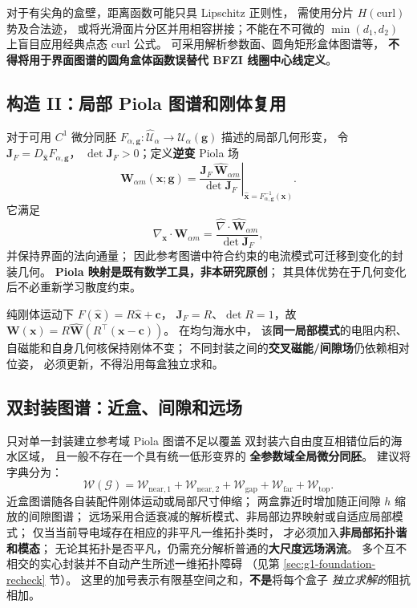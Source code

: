 对于有尖角的盒壁，距离函数可能只具 Lipschitz 正则性，
需使用分片 \(H(\mathrm{curl})\) 势及合法迹，
或将光滑面片分区并用相容拼接；不能在不可微的
\(\min(d_1,d_2)\) 上盲目应用经典点态 curl 公式。
可采用解析参数面、圆角矩形盒体图谱等，
\textbf{不得将用于界面图谱的圆角盒体函数误替代 BFZI 线圈中心线定义}。

\subsection{构造 II：局部 Piola 图谱和刚体复用}
对于可用 \(C^1\) 微分同胚
\(F_{\alpha,\bm g}:\widehat{\mathcal U}_\alpha
\to\mathcal U_\alpha(\bm g)\) 描述的局部几何形变，
令 \(\bm J_F=D_{\widehat{\bm x}}F_{\alpha,\bm g}\)，
\(\det\bm J_F>0\)；定义\textbf{逆变} Piola 场
\begin{equation}
\boxed{
\bm W_{\alpha m}(\bm x;\bm g)
=\left.\frac{\bm J_F\,\widehat{\bm W}_{\alpha m}}
{\det\bm J_F}\right|_{\widehat{\bm x}=F^{-1}_{\alpha,\bm g}(\bm x)}.
}
\label{eq:piola-atlas}
\end{equation}
它满足
\[
\nabla_{\bm x}\cdot\bm W_{\alpha m}
=\frac{\widehat\nabla\cdot\widehat{\bm W}_{\alpha m}}
{\det\bm J_F},
\]
并保持界面的法向通量；
因此参考图谱中符合约束的电流模式可迁移到变化的封装几何。
\textbf{Piola 映射是既有数学工具，非本研究原创}；
其具体优势在于几何变化后不必重新学习散度约束。

纯刚体运动下 \(F(\widehat{\bm x})=R\widehat{\bm x}+\bm c\)，
\(\bm J_F=R\)、\(\det R=1\)，故
\(\bm W(\bm x)=R\widehat{\bm W}(R^\top(\bm x-\bm c))\)。
在均匀海水中，
该\textbf{同一局部模式}的电阻内积、自磁能和自身几何核保持刚体不变；
不同封装之间的\textbf{交叉磁能/间隙场}仍依赖相对位姿，
必须更新，不得沿用每盒独立求和。

\subsection{双封装图谱：近盒、间隙和远场}
只对单一封装建立参考域 Piola 图谱不足以覆盖
双封装六自由度互相错位后的海水区域，
且一般不存在一个具有统一低形变界的
\textbf{全参数域全局微分同胚}。
建议将字典分为：
\begin{equation}
\boxed{
\mathcal W(\mathcal G)
=\mathcal W_{\mathrm{near},1}
+\mathcal W_{\mathrm{near},2}
+\mathcal W_{\mathrm{gap}}
+\mathcal W_{\mathrm{far}}
+\mathcal W_{\mathrm{top}} .
}
\label{eq:dictionary-decomp}
\end{equation}
近盒图谱随各自装配件刚体运动或局部尺寸伸缩；
两盒靠近时增加随正间隙 \(h\) 缩放的间隙图谱；
远场采用合适衰减的解析模式、非局部边界映射或自适应局部模式；
仅当当前导电域存在相应的非平凡一维拓扑类时，
才必须加入\textbf{非局部拓扑谐和模态}；
无论其拓扑是否平凡，仍需充分解析普通的\textbf{大尺度远场涡流}。
多个互不相交的实心封装并不自动产生所述一维拓扑障碍
（见第 \ref{sec:g1-foundation-recheck} 节）。
这里的加号表示有限基空间之和，\textbf{不是}将每个盒子
\emph{独立求解的}阻抗相加。

